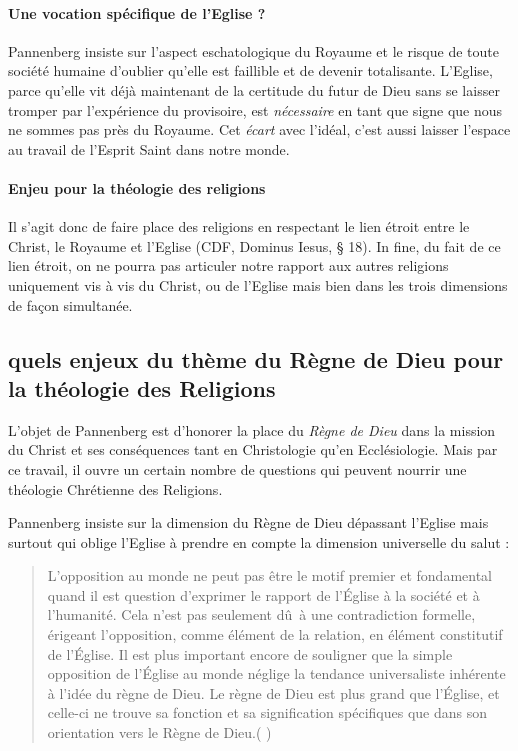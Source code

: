 \paragraph{Une vocation spécifique de l'Eglise ?} Pannenberg insiste sur l'aspect eschatologique du Royaume et le risque de toute société humaine d'oublier qu'elle est faillible et de devenir totalisante. 
 L'Eglise, parce qu'elle vit déjà maintenant de la certitude du futur de Dieu sans se laisser tromper par l'expérience du provisoire, est \textit{nécessaire} en tant que signe que nous ne sommes pas près du Royaume. Cet \textit{écart} avec l'idéal, c'est aussi laisser l'espace au travail de l'Esprit Saint dans notre monde.

\paragraph{Enjeu pour la théologie des religions}
Il s'agit donc de faire place des religions en respectant le lien étroit entre le Christ, le Royaume et l'Eglise (CDF, Dominus Iesus, § 18). In fine, du fait de ce lien étroit, on ne pourra pas articuler notre rapport aux autres religions uniquement vis à vis du Christ, ou de l'Eglise mais bien dans les trois dimensions de façon simultanée.

\subsection{quels enjeux du thème du Règne de Dieu pour la théologie des Religions}  

L'objet de Pannenberg est d'honorer la place du \textit{Règne de Dieu} dans la mission du Christ et ses conséquences tant en Christologie qu'en Ecclésiologie. Mais par ce travail, il ouvre un certain nombre de questions qui peuvent nourrir une théologie Chrétienne des Religions.

Pannenberg insiste sur la dimension du Règne de Dieu dépassant l'Eglise mais surtout qui oblige l'Eglise à prendre en compte la dimension universelle du salut : 
\begin{quote}
L’opposition au monde ne peut pas être le motif premier et fondamental quand il est question d’exprimer le rapport de l’Église à la société et à l’humanité. Cela n’est pas seulement dû à une contradiction formelle, érigeant l’opposition, comme élément de la relation, en élément constitutif de l’Église. Il est plus important encore de souligner que la simple opposition de l’Église au monde néglige la tendance universaliste inhérente à l’idée du règne de Dieu. Le règne de Dieu est plus grand que l’Église, et celle-ci ne trouve sa fonction et sa signification spécifiques que dans son orientation vers le Règne de Dieu.(\cite[pp. 75-76]{Pannenberg:RoyaumeDieu} )
 \end{quote}

